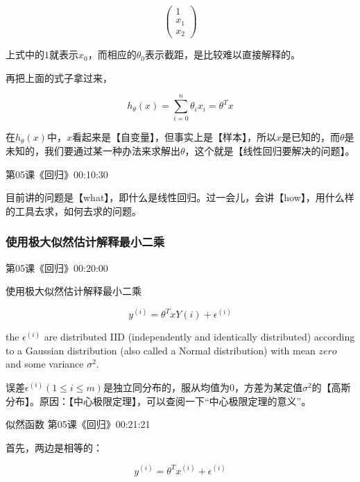 \documentclass[UTF8]{ctexart}
\begin{document}
\[ \left( \begin{array}{c}
1 \\
x_{1} \\
x_{2} \end{array} \right)\]

上式中的$1$就表示$x_{0}$，而相应的$\theta_{0}$表示截距，是比较难以直接解释的。



再把上面的式子拿过来，

\begin{displaymath}
h_{\theta}(x)=\sum_{i=0}^{n}\theta_{i}x_{i}=\theta^{T}x
\end{displaymath}

在$h_{\theta}(x)$中，$x$看起来是【自变量】，但事实上是【样本】，所以$x$是已知的，而$\theta$是未知的，我们要通过某一种办法来求解出$\theta$，这个就是【线性回归要解决的问题】。

第05课《回归》00:10:30

目前讲的问题是【what】，即什么是线性回归。过一会儿，会讲【how】，用什么样的工具去求，如何去求的问题。

\subsubsection{使用极大似然估计解释最小二乘}

第05课《回归》00:20:00

使用极大似然估计解释最小二乘

\begin{displaymath}
y^{(i)}=\theta^{T}xY{(i)}+\epsilon^{(i)}
\end{displaymath}

the $\epsilon^{(i)}$ are distributed IID (independently and identically distributed) according to a Gaussian distribution (also called a Normal distribution) with mean $zero$ and some variance $\sigma^{2}$.

误差$\epsilon^{(i)}(1 \leq i \leq m)$是独立同分布的，服从均值为$0$，方差为某定值$\sigma^{2}$的【高斯分布】。原因：【中心极限定理】，可以查阅一下“中心极限定理的意义”。

似然函数 第05课《回归》00:21:21

首先，两边是相等的：

\begin{displaymath}
y^{(i)}=\theta^{T}x^{(i)}+\epsilon^{(i)}
\end{displaymath}
\end{document}
